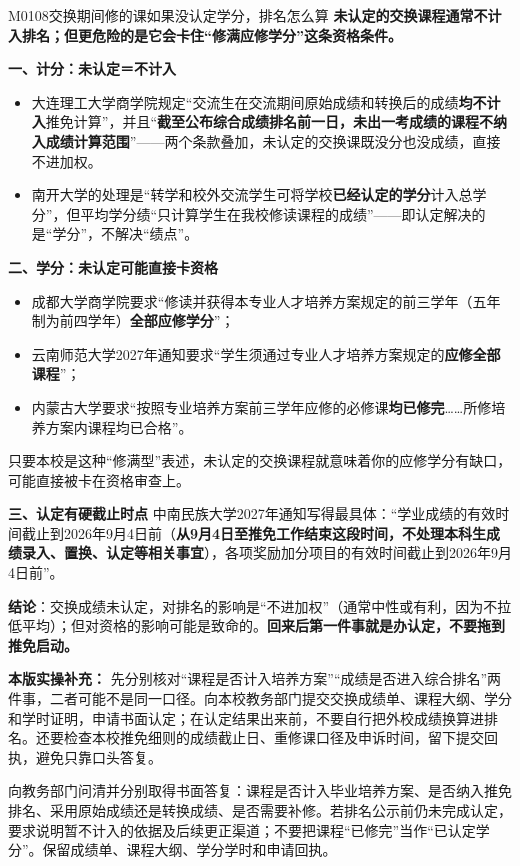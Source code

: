 \begin{qa}{M0108}{交换期间修的课如果没认定学分，排名怎么算}
\textbf{未认定的交换课程通常不计入排名；但更危险的是它会卡住“修满应修学分”这条资格条件。}

\textbf{一、计分：未认定＝不计入}
\begin{itemize}
  \item 大连理工大学商学院规定“交流生在交流期间原始成绩和转换后的成绩\textbf{均不计入}推免计算”，并且“\textbf{截至公布综合成绩排名前一日，未出一考成绩的课程不纳入成绩计算范围}”——两个条款叠加，未认定的交换课既没分也没成绩，直接不进加权。
  \item 南开大学的处理是“转学和校外交流学生可将学校\textbf{已经认定的学分}计入总学分”，但平均学分绩“只计算学生在我校修读课程的成绩”——即认定解决的是“学分”，不解决“绩点”。
\end{itemize}

\textbf{二、学分：未认定可能直接卡资格}
\begin{itemize}
  \item 成都大学商学院要求“修读并获得本专业人才培养方案规定的前三学年（五年制为前四学年）\textbf{全部应修学分}”；
  \item 云南师范大学2027年通知要求“学生须通过专业人才培养方案规定的\textbf{应修全部课程}”；
  \item 内蒙古大学要求“按照专业培养方案前三学年应修的必修课\textbf{均已修完}……所修培养方案内课程均已合格”。
\end{itemize}
只要本校是这种“修满型”表述，未认定的交换课程就意味着你的应修学分有缺口，可能直接被卡在资格审查上。

\textbf{三、认定有硬截止时点}
中南民族大学2027年通知写得最具体：“学业成绩的有效时间截止到2026年9月4日前（\textbf{从9月4日至推免工作结束这段时间，不处理本科生成绩录入、置换、认定等相关事宜}），各项奖励加分项目的有效时间截止到2026年9月4日前”。

\textbf{结论}：交换成绩未认定，对排名的影响是“不进加权”（通常中性或有利，因为不拉低平均）；但对资格的影响可能是致命的。\textbf{回来后第一件事就是办认定，不要拖到推免启动。}
\par\textbf{本版实操补充：} 先分别核对“课程是否计入培养方案”“成绩是否进入综合排名”两件事，二者可能不是同一口径。向本校教务部门提交交换成绩单、课程大纲、学分和学时证明，申请书面认定；在认定结果出来前，不要自行把外校成绩换算进排名。还要检查本校推免细则的成绩截止日、重修课口径及申诉时间，留下提交回执，避免只靠口头答复。

向教务部门问清并分别取得书面答复：课程是否计入毕业培养方案、是否纳入推免排名、采用原始成绩还是转换成绩、是否需要补修。若排名公示前仍未完成认定，要求说明暂不计入的依据及后续更正渠道；不要把课程“已修完”当作“已认定学分”。保留成绩单、课程大纲、学分学时和申请回执。
\end{qa}

